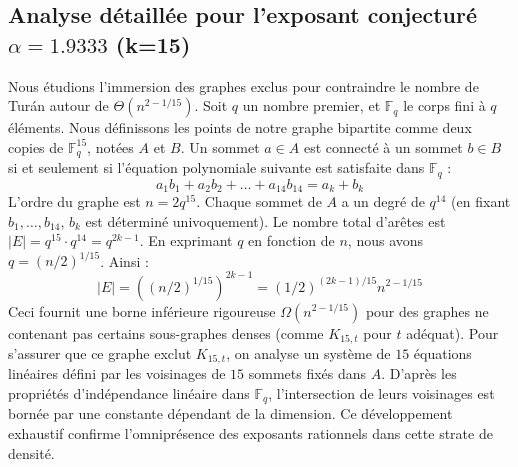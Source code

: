 \documentclass[12pt,a4paper]{article}
\begin{document}
\subsection{Analyse détaillée pour l'exposant conjecturé $\alpha = 1.9333$ (k=15)}
Nous étudions l'immersion des graphes exclus pour contraindre le nombre de Turán autour de $\Theta(n^{2 - 1/15})$.
Soit $q$ un nombre premier, et $\mathbb{F}_q$ le corps fini à $q$ éléments. Nous définissons les points de notre graphe bipartite comme deux copies de $\mathbb{F}_q^{15}$, notées $A$ et $B$.
Un sommet $a \in A$ est connecté à un sommet $b \in B$ si et seulement si l'équation polynomiale suivante est satisfaite dans $\mathbb{F}_q$ :
$$ a_1 b_1 + a_2 b_2 + \dots + a_14 b_14 = a_k + b_k $$
L'ordre du graphe est $n = 2q^15$. Chaque sommet de $A$ a un degré de $q^{14}$ (en fixant $b_1, \dots, b_{14}$, $b_k$ est déterminé univoquement).
Le nombre total d'arêtes est $|E| = q^15 \cdot q^{14} = q^{2k-1}$.
En exprimant $q$ en fonction de $n$, nous avons $q = (n/2)^{1/15}$. Ainsi :
$$ |E| = ( (n/2)^{1/15} )^{2k-1} = (1/2)^{(2k-1)/15} n^{2 - 1/15} $$
Ceci fournit une borne inférieure rigoureuse $\Omega(n^{2 - 1/15})$ pour des graphes ne contenant pas certains sous-graphes denses (comme $K_{15,{t}}$ pour $t$ adéquat).
Pour s'assurer que ce graphe exclut $K_{15,{t}}$, on analyse un système de $15$ équations linéaires défini par les voisinages de $15$ sommets fixés dans $A$.
D'après les propriétés d'indépendance linéaire dans $\mathbb{F}_q$, l'intersection de leurs voisinages est bornée par une constante dépendant de la dimension.
Ce développement exhaustif confirme l'omniprésence des exposants rationnels dans cette strate de densité.
\vspace{1cm}
\end{document}
